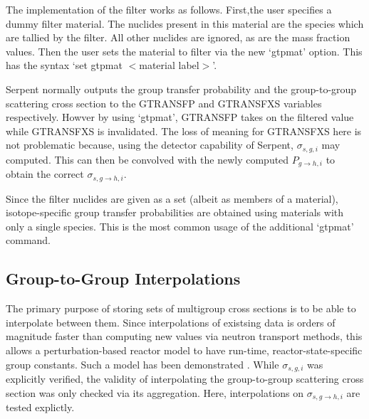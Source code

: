 \documentclass{physor2012}
\begin{document}
The implementation of the filter works as follows. First,the user specifies
a dummy filter material.  The nuclides present in this material are the species 
which are tallied by the filter.  All other nuclides are ignored, as are the mass 
fraction values.  Then the user sets the material to filter via the new `gtpmat'
option.  This has the syntax `set gtpmat $<$material label$>$'.

Serpent normally outputs the group transfer probability and the group-to-group
scattering cross section to the GTRANSFP and GTRANSFXS variables respectively.
Howver by using `gtpmat', GTRANSFP takes on the filtered value while GTRANSFXS
is invalidated.  The loss of meaning for GTRANSFXS here is not problematic
because, using the detector capability of Serpent, $\sigma_{s,g,i}$ may computed.
This can then be convolved with the newly computed $P_{g\to h,i}$ to obtain
the correct $\sigma_{s,g\to h,i}$.

Since the filter nuclides are given as a set (albeit as members of a material), 
isotope-specific group transfer probabilities are obtained using materials with 
only a single species.  This is the most common usage of the additional `gtpmat'
command.

\subsection{Group-to-Group Interpolations}

The primary purpose of storing sets of multigroup cross sections is 
to be able to interpolate between them.  Since interpolations of existsing 
data is orders of magnitude faster than computing new values via neutron 
transport methods, this allows a perturbation-based reactor model to have
run-time, reactor-state-specific group constants.  Such a model has been
demonstrated \cite{}.  While $\sigma_{s,g,i}$ was explicitly 
verified, the validity of interpolating the group-to-group scattering
cross section was only checked via its aggregation.  Here, interpolations on
$\sigma_{s,g\to h,i}$ are tested explictly.
\end{document}
